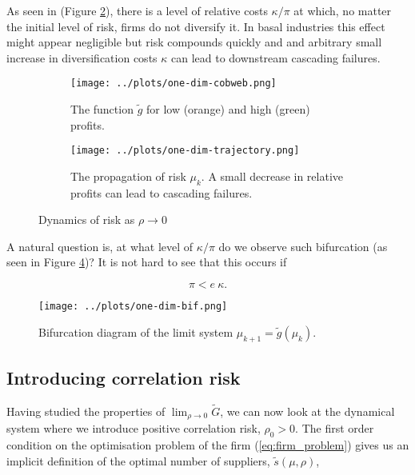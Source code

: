 \documentclass[../../main.tex]{subfiles}
\begin{document}
As seen in (Figure \ref{fig:one-dimensional:trajectory}), there is a level of relative costs $\kappa / \pi$ at which, no matter the initial level of risk, firms do not diversify it. In basal industries this effect might appear negligible but risk compounds quickly and and arbitrary small increase in diversification costs $\kappa$ can lead to downstream cascading failures.


\begin{figure}[H]
  \begin{subfigure}{0.45\textwidth}
    \centering
    \texttt{[image: ../plots/one-dim-cobweb.png]}
    \caption{The function $\tilde{g}$ for low (orange) and high (green) profits.}
    \label{fig:one-dimensional:cobweb}
  \end{subfigure} \hfill
  \begin{subfigure}{0.45\textwidth}
    \centering
    \texttt{[image: ../plots/one-dim-trajectory.png]}
    \caption{The propagation of risk $\mu_k$. A small decrease in relative profits can lead to cascading failures. }
    \label{fig:one-dimensional:trajectory}
  \end{subfigure}
  \caption{Dynamics of risk as $\rho \rightarrow 0$}
  \label{fig:one-dimensional}
\end{figure}

A natural question is, at what level of $\kappa / \pi$ do we observe such bifurcation (as seen in Figure \ref{fig:one-dimensional-bifurcation})? It is not hard to see that this occurs if 

\begin{equation}
  \pi < e \ \kappa.
\end{equation}

\begin{figure}[H]
  \centering
  \texttt{[image: ../plots/one-dim-bif.png]}
  \caption{Bifurcation diagram of the limit system $\mu_{k + 1} = \tilde{g}(\mu_k)$.}
  \label{fig:one-dimensional-bifurcation}
\end{figure}

\subsection{Introducing correlation risk}

Having studied the properties of $\lim_{\rho \rightarrow 0 } \tilde{G}$, we can now look at the dynamical system where we introduce positive correlation risk, $\rho_0 > 0$. The first order condition on the optimisation problem of the firm (\ref{eq:firm_problem}) gives us an implicit definition of the optimal number of suppliers, $\tilde{s}(\mu, \rho)$,
\end{document}
